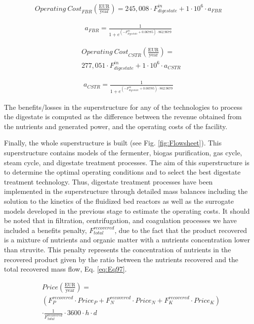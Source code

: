 \begin{refsection}[referencesCh2]
\begin{align}
	{Operating \ Cost}_{FBR} \left( \frac{\text{EUR}}{\text{year}} \right) = 245,008 \cdot F_{digestate}^{in} +  1 \cdot {10^6} \cdot {a}_{FBR} \label{eq:Eq93}
\end{align}

\begin{align}
	{a}_{FBR} = \frac{1}{1 + {e^{\left( { - F_{digestate}^{in} + 0.06785} \right) \cdot 862.9679}}} \label{eq:Eq94}
\end{align}

\begin{align}
	&{Operating \ Cost}_{CSTR} \left( \frac{\text{EUR}}{\text{year}} \right) = \label{eq:Eq95} \\
	& 277,051 \cdot F_{digestate}^{in} +  1 \cdot {10^6} \cdot {a}_{CSTR} \nonumber
\end{align}

\begin{align}
	{a}_{CSTR} = \frac{1}{1 + {e^{\left( { - F_{digestate}^{in} + 0.06785} \right) \cdot 862.9679}}} \label{eq:Eq96}
\end{align}

The benefits/losses in the superstructure for any of the technologies to process the digestate is computed as the difference between the revenue obtained from the nutrients and generated power, and the operating costs of the facility.

Finally, the whole superstructure is built (see Fig. \ref{fig:Flowsheet}). This superstructure contains models of the fermenter, biogas purification, gas cycle, steam cycle, and digestate treatment processes. The aim of this superstructure is to determine the optimal operating conditions and to select the best digestate treatment technology. Thus, digestate treatment processes have been implemented in the superstructure through detailed mass balances including the solution to the kinetics of the fluidized bed reactors as well as the surrogate models developed in the previous stage to estimate the operating costs. It should be noted that in filtration, centrifugation, and coagulation processes we have included a benefits penalty, $F^{recovered}_{total}$, due to the fact that the product recovered is a mixture of nutrients and organic matter with a nutrients concentration lower than struvite. This penalty represents the concentration of nutrients in the recovered product given by the ratio between the nutrients recovered and the total recovered mass flow, Eq. \ref{eq:Eq97}.

\begin{align}
	& {Price} \left( \frac{\text{EUR}}{\text{year}} \right) = \label{eq:Eq97} \\ 
	& \left( {F_P^{recovered}\cdot{Price}_P} + F_N^{recovered} \cdot {Price}_N + F_{K}^{recovered} \cdot {Price}_K \right) \nonumber\\
	& \cdot \frac{1}{F_{total}^{recovered}} \cdot 3600 \cdot h\cdot d \nonumber
\end{align}


\end{refsection}
